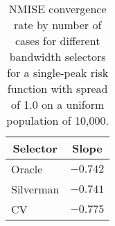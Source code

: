 \begin{table}[htbp]
\begin{center}
\begin{tabular}{lr}
\toprule
\multicolumn{1}{c}{Selector}&\multicolumn{1}{c}{Slope}\tabularnewline
\midrule
Oracle&$-0.742$\tabularnewline
Silverman&$-0.741$\tabularnewline
CV&$-0.775$\tabularnewline
\bottomrule
\end{tabular}
\caption[NMISE Convergence rate by number of cases for spread 1.0]{NMISE convergence rate by number of cases for different bandwidth selectors for a single-peak risk function with spread of 1.0 on a uniform population of 10,000.\label{tab:results:nmise_convergence_by_num_cases}}\end{center}
\end{table}
